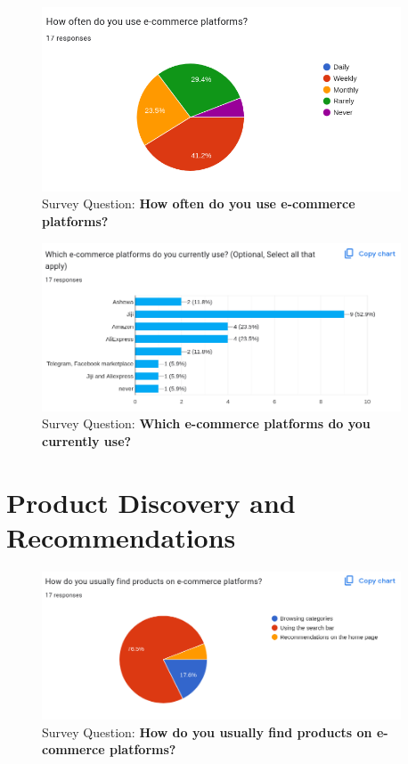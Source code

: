 \documentclass[12pt]{report}
\begin{document}
\begin{appendices}
	\begin{figure}[H]
		\begin{center}
			\includegraphics[width=0.95\textwidth]{survey/q3}
		\end{center}
		\caption{Survey Question: \textbf{How often do you use e-commerce platforms?}}
	\end{figure}

	\begin{figure}[H]
		\begin{center}
			\includegraphics[width=0.95\textwidth]{survey/q4}
		\end{center}
		\caption{Survey Question: \textbf{Which e-commerce platforms do you currently use? }}
	\end{figure}

	\section {Product Discovery and Recommendations}
	\begin{figure}[H]
		\begin{center}
			\includegraphics[width=0.95\textwidth]{survey/q5}
		\end{center}
		\caption{Survey Question: \textbf{How do you usually find products on e-commerce platforms?}}
	\end{figure}


\end{appendices}
\end{document}
